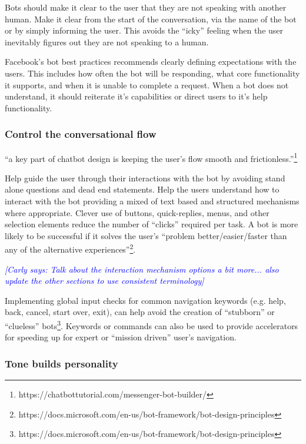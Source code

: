 \documentclass{sig-alternate}
\newcommand{\cl}[1]{\textcolor{blue}{{\it [Carly says: #1]}}}
\begin{document}
	Bots should make it clear to the user that they are not speaking with another human.  Make it clear from the start of the conversation, via the name of the bot or by simply informing the user.  This avoids the ``icky'' feeling when the user inevitably figures out they are not speaking to a human.

	Facebook's bot best practices recommends clearly defining expectations with the users.  This includes how often the bot will be responding, what core functionality it supports, and when it is unable to complete a request.  When a bot does not understand, it should reiterate it's capabilities or direct users to it's help functionality.


	\subsubsection{Control the conversational flow}

	``a key part of chatbot design is keeping the user’s flow smooth and frictionless.''\footnote{https://chatbottutorial.com/messenger-bot-builder/}

	Help guide the user through their interactions with the bot by avoiding stand alone questions and dead end statements. Help the users understand how to interact with the bot providing a mixed of text based and structured  mechanisms where appropriate.  Clever use of buttons, quick-replies, menus, and other selection elements reduce the number of ``clicks'' required per task.  A bot is more likely to be successful if it solves the user's ``problem better/easier/faster than any of the alternative experiences''\footnote{https://docs.microsoft.com/en-us/bot-framework/bot-design-principles}.

	\cl{Talk about the interaction mechanism options a bit more... also update the other sections to use consistent terminology}

	Implementing global input checks for common navigation keywords (e.g. help, back, cancel, start over, exit), can help avoid the creation of ``stubborn'' or ``clueless'' bots\footnote{https://docs.microsoft.com/en-us/bot-framework/bot-design-principles}. Keywords or commands can also be used to provide accelerators for speeding up for expert or ``mission driven'' user's navigation. 

	\subsubsection{Tone builds personality}
\end{document}
